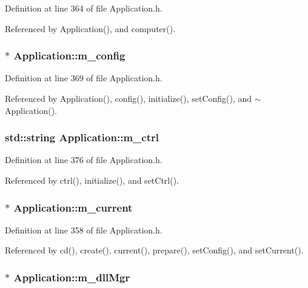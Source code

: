 Definition at line 364 of file Application.h.

Referenced by Application(), and computer().\hypertarget{classApplication_ae05f3e253ea871a194c3d30fd1d3b0c3}{
\subsubsection[{m\_\-config}]{$\ast$ {\bf Application::m\_\-config}}}
\label{classApplication_ae05f3e253ea871a194c3d30fd1d3b0c3}


Definition at line 369 of file Application.h.

Referenced by Application(), config(), initialize(), setConfig(), and $\sim$Application().\hypertarget{classApplication_aa371ed989ed34038df400c4d1b41b37f}{
\subsubsection[{m\_\-ctrl}]{\setlength{\rightskip}{0pt plus 5cm}std::string {\bf Application::m\_\-ctrl}}}
\label{classApplication_aa371ed989ed34038df400c4d1b41b37f}


Definition at line 376 of file Application.h.

Referenced by ctrl(), initialize(), and setCtrl().\hypertarget{classApplication_ab0fd877a3c66c41b22109863e1719ccd}{
\subsubsection[{m\_\-current}]{$\ast$ {\bf Application::m\_\-current}}}
\label{classApplication_ab0fd877a3c66c41b22109863e1719ccd}


Definition at line 358 of file Application.h.

Referenced by cd(), create(), current(), prepare(), setConfig(), and setCurrent().\hypertarget{classApplication_a66b06cbeb824fe00ecd11499fcf01c55}{
\subsubsection[{m\_\-dllMgr}]{$\ast$ {\bf Application::m\_\-dllMgr}}}
\label{classApplication_a66b06cbeb824fe00ecd11499fcf01c55}


